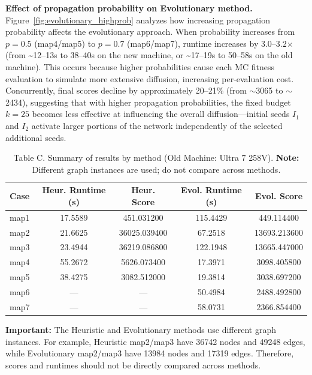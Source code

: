 \documentclass[onecolumn,a4paper,12pt]{IEEEtran}
\begin{document}
\textbf{Effect of propagation probability on Evolutionary method.} Figure~\ref{fig:evolutionary_highprob} analyzes how increasing propagation probability affects the evolutionary approach. When probability increases from $p=0.5$ (map4/map5) to $p=0.7$ (map6/map7), runtime increases by 3.0--3.2$\times$ (from \textasciitilde12--13s to 38--40s on the new machine, or \textasciitilde17--19s to 50--58s on the old machine). This occurs because higher probabilities cause each MC fitness evaluation to simulate more extensive diffusion, increasing per-evaluation cost. Concurrently, final scores decline by approximately 20--21\% (from $\sim$3065 to $\sim$2434), suggesting that with higher propagation probabilities, the fixed budget $k=25$ becomes less effective at influencing the overall diffusion—initial seeds $I_1$ and $I_2$ activate larger portions of the network independently of the selected additional seeds.

\begin{table}[h]
\centering
\caption{Table C. Summary of results by method (Old Machine: Ultra 7 258V). \textbf{Note:} Different graph instances are used; do not compare across methods.}
\begin{tabular}{lcccc}
\toprule
Case & Heur. Runtime (s) & Heur. Score & Evol. Runtime (s) & Evol. Score \\
\midrule
map1 & 17.5589 & 451.031200 & 115.4429 & 449.114400 \\
map2 & 21.6625 & 36025.039400 & 67.2518 & 13693.213600 \\
map3 & 23.4944 & 36219.086800 & 122.1948 & 13665.447000 \\
map4 & 55.2672 & 5626.073400 & 17.3971 & 3098.405800 \\
map5 & 38.4275 & 3082.512000 & 19.3814 & 3038.697200 \\
map6 & --- & --- & 50.4984 & 2488.492800 \\
map7 & --- & --- & 58.0731 & 2366.854400 \\
\bottomrule
\end{tabular}
\end{table}

\textbf{Important:} The Heuristic and Evolutionary methods use different graph instances. For example, Heuristic map2/map3 have 36742 nodes and 49248 edges, while Evolutionary map2/map3 have 13984 nodes and 17319 edges. Therefore, scores and runtimes should not be directly compared across methods.
\end{document}
